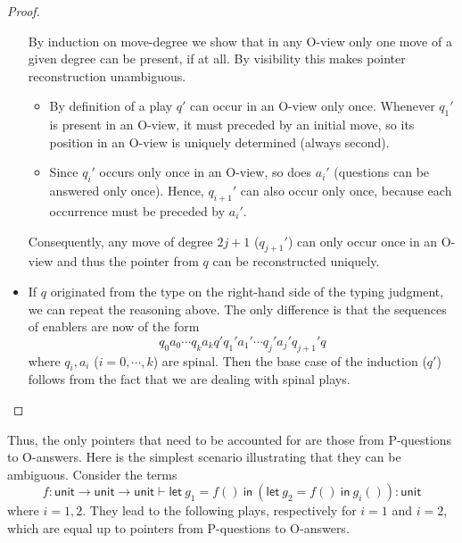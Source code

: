 \documentclass{CSML}
\theoremstyle{definition}\newtheorem{definition}[thm]{Definition}
\theoremstyle{definition}\newtheorem{example}[thm]{Example}
\theoremstyle{definition}\newtheorem{proposition}[thm]{Proposition}
\theoremstyle{definition}\newtheorem{lemma}[thm]{Lemma}
\theoremstyle{definition}\newtheorem{theorem}[thm]{Theorem}
\theoremstyle{definition}\newtheorem{corollary}[thm]{Corollary}
\theoremstyle{definition}\newtheorem{remark}[thm]{Remark}
\newcommand\letin[2]{\mathsf{let}\ #1\ \mathsf{in}\ #2}
\newcommand\comt{\mathsf{unit}}
\newcommand{\rarr}{\rightarrow}
\newcommand\seq[2]{{#1} \vdash {#2}}
\begin{document}
\begin{proof}
\begin{itemize}
By induction on move-degree we show that in any O-view
only one move of a given degree can be present, if at all.
By visibility this makes pointer reconstruction unambiguous. 
\begin{itemize}
\item By definition of a play $q'$ can occur in an O-view only once.
Whenever $q_1'$ is present in an O-view, it must preceded by an initial move,
so its  position in an O-view is uniquely determined (always second).
\item Since $q_i'$ occurs only once in an O-view, so does $a_i'$ (questions can be
answered only once). Hence, $q_{i+1}'$ can also occur only once, because each
occurrence must be preceded by $a_i'$.
\end{itemize}
Consequently, any move of degree $2j+1$ ($q_{j+1}'$) 
can only occur once in an O-view and thus the pointer from $q$
can be reconstructed uniquely.
\item If $q$ originated from the type on the right-hand side of the typing
judgment, we can repeat the reasoning above. The only difference is
that the sequences of enablers are now of the form
\[
q_0 a_0 \cdots q_k a_k q' q_1' a_1' \cdots q_j' a_j' q_{j+1}' q
\]
where $q_i, a_i$ ($i=0,\cdots,k$) are spinal. Then the base case
of the induction ($q'$) follows from the fact that we are dealing with
spinal plays.\qedhere
\end{itemize}
\end{proof}

\noindent Thus, the only pointers that need to be accounted for are those from P-questions
to O-answers. Here is the simplest scenario illustrating that they can be ambiguous.
Consider the terms 
\[
\seq{f:\comt\rarr\comt\rarr\comt}{\letin{g_1=f()}{(\letin{g_2=f()}{g_i()})}:\comt}
\]
where $i=1,2$.
They lead to the following plays, respectively for $i=1$ and $i=2$, which are equal up to 
pointers from P-questions to O-answers.

\medskip
\end{document}
